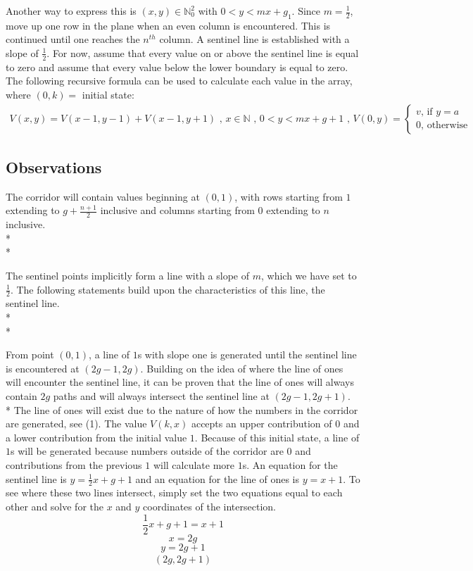 \documentclass{article}
\newcommand*{\set}[1]{\mathbb{#1}}
\theoremstyle{definition}
\begin{document}
  Another way to express this is $(x,y) \in \set{N}_0^2$ with $0 < y < mx+g_1$. Since $m=\frac{1}{2}$, move up one row in the plane when an even column
  is encountered. This is continued until one reaches the $n^{th}$ column. A sentinel line is
  established with a slope of $\frac{1}{2}$. For now, assume that every value on or above the sentinel line 
  is equal to zero and assume that every value below the lower boundary is equal to zero. The following recursive formula can be used to
  calculate each value in the array, where $(0, k) = $ initial state:
	\begin{align}
		V(x,y) = V(x-1, y-1) + V(x-1,y+1)\text{ , }
		x \in \set{N} \text{ , } 0 < y < mx+g+1\text{ , }
		V(0,y) =  \begin{cases}
			v \text{, if }y=a\\
			0 \text{, otherwise}
		\end{cases}
	\end{align}
  
 
  
  \subsection*{Observations}
    \noindent The corridor will contain values beginning at $(0,1)$, with rows starting from $1$ extending to $g+ \frac{n+1}{2}$ inclusive
    and columns starting from $0$ extending to $n$ inclusive.\\*\\*
    
    \noindent The sentinel points implicitly form a line with a slope of $m$, which we have set to $\frac{1}{2}$. The following statements 
    build upon the characteristics of this line, the sentinel line.\\*\\*

    \noindent From point $(0, 1)$, a line of $1$s with slope one is generated until the sentinel line is encountered at $(2g-1, 2g)$.
    Building on the idea of where the line of ones will encounter the sentinel line, it can be proven that the line of ones will always contain $2g$ paths and will always 
    intersect the sentinel line at $(2g-1, 2g+1)$.\\*
    The line of ones will exist due to the nature of how the numbers in the corridor are generated, see (1). The value $V(k,x)$ accepts an upper contribution of $0$ and a
    lower contribution from the initial value $1$. Because of this initial state, a line of $1$s will be generated because numbers outside of the corridor are $0$ and 
    contributions from the previous $1$ will calculate more $1$s. An equation for the sentinel line is $y = \frac{1}{2}x+g+1$ and an equation for the line of ones 
    is $y=x+1$. To see where these two lines intersect, simply set the two equations equal to each other and solve for the $x$ and $y$ coordinates of the intersection.\\
    \[\frac{1}{2}x+g+1=x+1\]
    \[x = 2g\]
    \[y=2g+1\]
    \begin{align}(2g, 2g+1) \end{align} \\
    
\end{document}
